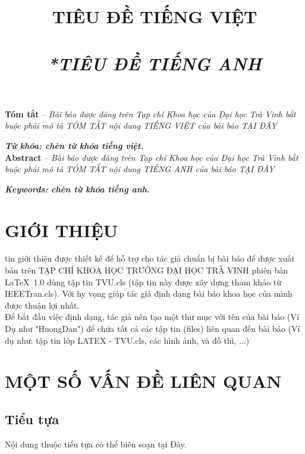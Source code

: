 \documentclass[a4paper,journal,11pt]{IEEEtran}
\title{\Large\bf
\changefontsizes{16pt}TIÊU ĐỀ TIẾNG VIỆT
\normalfont
\\
\Large \changefontsizes{14pt} \textit{\\*TIÊU ĐỀ TIẾNG ANH}
}
\begin{document}
\pagestyle{fancy}
\fancyhf{}
\cfoot{\thepage}
\maketitle
\renewcommand\headrule{}

\textbf{Tóm tắt} -- \textit {Bài báo được đăng trên Tạp chí Khoa học của Đại học Trà Vinh bắt buộc phải mô tả TÓM TẮT nội dung TIẾNG VIỆT của bài báo TẠI ĐÂY}
	
\textbf{\textit {Từ khóa: chèn từ khóa tiếng việt.}}\\

\textbf{Abstract} -- \textit {Bài báo được đăng trên Tạp chí Khoa học của Đại học Trà Vinh bắt buộc phải mô tả TÓM TẮT nội dung TIẾNG ANH của bài báo TẠI ĐÂY}
	
\textbf{\textit {Keywords: chèn từ khóa tiếng anh.}}
\section{GIỚI THIỆU}
	tin giới thiệu được thiết kế để hỗ trợ cho tác giả chuẩn bị bài báo để được xuất bản trên \textsc{TẠP CHÍ KHOA HỌC TRƯỜNG ĐẠI HỌC TRÀ VINH} phiên bản \LaTeX\ 1.0 dùng tập tin TVU.cls (tập tin này được xây dựng tham khảo từ IEEETran.cls).
Với hy vọng giúp tác giả định dạng bài báo khoa học của mình được thuận lợi nhất. \\
Để bắt đầu việc định dạng, tác giả nên tạo một thư mục với tên của bài báo (Ví Dụ như "HuongDan") để chứa tất cả các tập tin (files) liên quan đến bài báo (Ví dụ như: tập tin lớp LATEX - TVU.cls, các hình ảnh, và đồ thì, ...)
\section{MỘT SỐ VẤN ĐỀ LIÊN QUAN}
\subsection{Tiểu tựa}
Nội dung thuộc tiểu tựa có thể biên soạn tại Đây.
\end{document}
